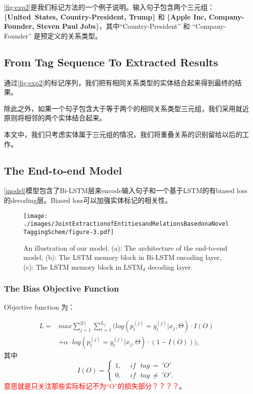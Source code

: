 \documentclass[a4paper,UTF8,no-math]{ctexart}
\begin{document}
	
	\autoref{fig:exp2}是我们标记方法的一个例子说明。输入句子包含两个三元组：\{\textbf{United~States, Country-President,  Trump}\} 和 \{\textbf{Apple Inc, Company-Founder, Steven Paul Jobs}\}，其中“Country-President” 和 “Company-Founder” 是预定义的关系类型。
	
	\subsection{From Tag Sequence To Extracted Results}
	
	通过\autoref{fig:exp2}的标记序列，我们把有相同关系类型的实体结合起来得到最终的结果。
	
	除此之外，如果一个句子包含大于等于两个的相同关系类型三元组，我们采用就近原则将相邻的两个实体结合起来。
	
	本文中，我们只考虑实体属于三元组的情况，我们将重叠关系的识别留给以后的工作。
	
	
	\subsection{The End-to-end Model}
	
	\autoref{model}模型包含了Bi-LSTM层来encode输入句子和一个基于LSTM的有biased loss的decoding层。Biased loss可以加强实体标记的相关性。
	
	\begin{figure*}[ht]
		\begin{center}
			\texttt{[image: ./images/JointExtractionofEntitiesandRelationsBasedonaNovelTaggingSchem/figure-3.pdf]}
			\caption{\label{model}
				An illustration of our model. (a): The architecture of the end-to-end model,
				(b): The LSTM memory block in Bi-LSTM encoding layer, (c): The LSTM memory block in LSTM$_d$ decoding layer.
			}
		\end{center}
	\end{figure*}

	\subsubsection{The Bias Objective Function}
	
	Objective function 为：
	
	\begin{align*}L =& max \sum\limits_{j=1}^{|\mathbb D|} \sum\limits_{t=1}^{L_j}{(log(p_t^{(j)} = y_t^{(j)}|x_j,\Theta )\cdot I(O)} \\&{+
		\alpha\cdot log(p_t^{(j)} = y_t^{(j)}|x_j,\Theta )\cdot (1-I(O)))},\end{align*}其中$$ I(O)=\left\{
	\begin{aligned}
1, & ~~if ~~~tag~=~'O' \\
0, & ~~if ~~~tag~\ne~'O'
.\end{aligned}
\right.
$$\textcolor{red}{意思就是只关注那些实际标记不为“O”的损失部分？？？？}。
\end{document}

